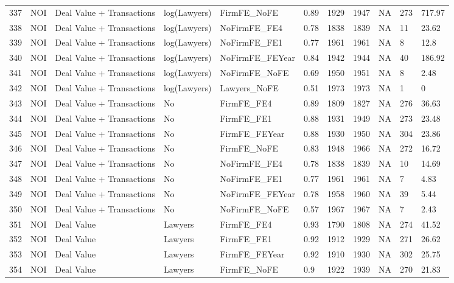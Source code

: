 \documentclass{article}
\begin{document}
\begin{table}[H]
\begin{tabular}{rllllllllll}
  337 & NOI & Deal Value + Transactions & log(Lawyers) & FirmFE\_NoFE & 0.89 & 1929 & 1947 & NA & 273 & 717.97 \\ 
  338 & NOI & Deal Value + Transactions & log(Lawyers) & NoFirmFE\_FE4 & 0.78 & 1838 & 1839 & NA & 11 & 23.62 \\ 
  339 & NOI & Deal Value + Transactions & log(Lawyers) & NoFirmFE\_FE1 & 0.77 & 1961 & 1961 & NA & 8 & 12.8 \\ 
  340 & NOI & Deal Value + Transactions & log(Lawyers) & NoFirmFE\_FEYear & 0.84 & 1942 & 1944 & NA & 40 & 186.92 \\ 
  341 & NOI & Deal Value + Transactions & log(Lawyers) & NoFirmFE\_NoFE & 0.69 & 1950 & 1951 & NA & 8 & 2.48 \\ 
  342 & NOI & Deal Value + Transactions & log(Lawyers) & Lawyers\_NoFE & 0.51 & 1973 & 1973 & NA & 1 & 0 \\ 
  343 & NOI & Deal Value + Transactions & No & FirmFE\_FE4 & 0.89 & 1809 & 1827 & NA & 276 & 36.63 \\ 
  344 & NOI & Deal Value + Transactions & No & FirmFE\_FE1 & 0.88 & 1931 & 1949 & NA & 273 & 23.48 \\ 
  345 & NOI & Deal Value + Transactions & No & FirmFE\_FEYear & 0.88 & 1930 & 1950 & NA & 304 & 23.86 \\ 
  346 & NOI & Deal Value + Transactions & No & FirmFE\_NoFE & 0.83 & 1948 & 1966 & NA & 272 & 16.72 \\ 
  347 & NOI & Deal Value + Transactions & No & NoFirmFE\_FE4 & 0.78 & 1838 & 1839 & NA & 10 & 14.69 \\ 
  348 & NOI & Deal Value + Transactions & No & NoFirmFE\_FE1 & 0.77 & 1961 & 1961 & NA & 7 & 4.83 \\ 
  349 & NOI & Deal Value + Transactions & No & NoFirmFE\_FEYear & 0.78 & 1958 & 1960 & NA & 39 & 5.44 \\ 
  350 & NOI & Deal Value + Transactions & No & NoFirmFE\_NoFE & 0.57 & 1967 & 1967 & NA & 7 & 2.43 \\ 
  351 & NOI & Deal Value & Lawyers & FirmFE\_FE4 & 0.93 & 1790 & 1808 & NA & 274 & 41.52 \\ 
  352 & NOI & Deal Value & Lawyers & FirmFE\_FE1 & 0.92 & 1912 & 1929 & NA & 271 & 26.62 \\ 
  353 & NOI & Deal Value & Lawyers & FirmFE\_FEYear & 0.92 & 1910 & 1930 & NA & 302 & 25.75 \\ 
  354 & NOI & Deal Value & Lawyers & FirmFE\_NoFE & 0.9 & 1922 & 1939 & NA & 270 & 21.83 \\ 

\end{tabular}
\end{table}
\end{document}
